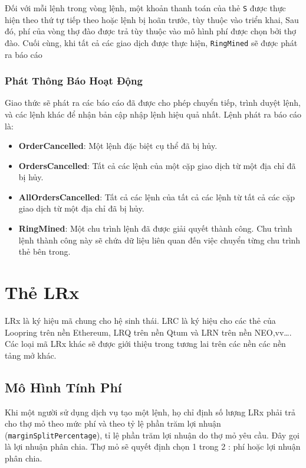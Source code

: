 \documentclass{article}
\begin{document}
\begin{multicols}{2}
Đối với mỗi lệnh trong vòng lệnh, một khoản thanh toán của thẻ \verb|S| được thực hiện theo thứ tự tiếp theo hoặc lệnh bị hoãn trước, tùy thuộc vào triển khai, Sau đó, phí của vòng thợ đào được trả tùy thuộc vào mô hình phí được chọn bởi thợ đào. Cuối cùng, khi tất cả các giao dịch được thực hiện, \verb|RingMined| sẽ được phát ra báo cáo


\subsubsection{Phát Thông Báo Hoạt Động\label{sec:events}}

Giao thức sẽ phát ra các báo cáo đã được cho phép chuyển tiếp, trình duyệt lệnh, và các lệnh khác để nhận bản cập nhập lệnh hiệu quả nhất. Lệnh phát ra báo cáo là:

\begin{itemize}
	\item \textbf{OrderCancelled}: Một lệnh đặc biệt cụ thể đã bị hủy.
	\item \textbf{OrdersCancelled}: Tất cả các lệnh của một cặp giao dịch từ một địa chỉ đã bị hủy.
	\item \textbf{AllOrdersCancelled}: Tất cả các lệnh của tất cả các lệnh từ tất cả các cặp giao dịch từ một địa chỉ đã bị hủy.
	\item \textbf{RingMined}: Một chu trình lệnh  đã được giải quyết thành công. Chu trình lệnh thành công này sẽ chứa dữ liệu liên quan đến việc chuyển từng chu trình thẻ bên trong.
\end{itemize}


\section{Thẻ LRx\label{sec:token}}
LRx là ký hiệu mã chung cho hệ sinh thái. LRC là ký hiệu cho các thẻ của Loopring trên nền Ethereum, LRQ trên nền Qtum và LRN trên nền NEO,vv…. Các loại mã LRx khác sẽ được giới thiệu trong tương lai trên các nền các nền tảng mở khác.

\subsection{Mô Hình Tính Phí\label{sec:fee_model}} 
Khi một người sử dụng dịch vụ tạo một lệnh, họ chỉ định số lượng LRx phải trả cho thợ mỏ theo mức phí và theo tỷ lệ phần trăm lợi nhuận (\verb|marginSplitPercentage|), tỉ lệ phần trăm lợi nhuận do thợ mỏ yêu cầu. Đây gọi là lợi nhuận phân chia. Thợ mỏ sẽ quyết định chọn 1 trong 2 : phí hoặc lợi nhuận phân chia.


\end{multicols}
\end{document}
